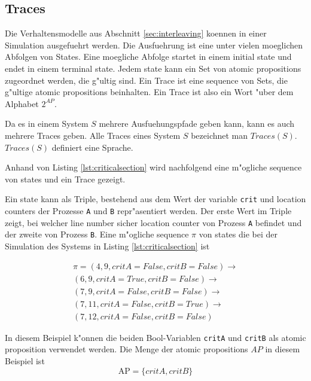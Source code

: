 \documentclass[11pt,twoside,a4paper]{article}
\begin{document}
\subsection{Traces}
\label{sec:traces}

Die Verhaltensmodelle aus Abschnitt \ref{sec:interleaving} koennen in einer Simulation ausgefuehrt werden. Die Ausfuehrung ist eine unter vielen moeglichen Abfolgen von States. Eine moegliche Abfolge startet in einem initial state und endet in einem terminal state. Jedem state kann ein Set von atomic propositions zugeordnet werden, die g"ultig sind. Ein Trace ist eine sequence von Sets, die g"ultige atomic propositions beinhalten. Ein Trace ist also ein Wort "uber dem Alphabet $2^{AP}$.

Da es in einem System $S$ mehrere Ausfuehungspfade geben kann, kann es auch mehrere Traces geben. Alle Traces eines System $S$ bezeichnet man $Traces(S)$. $Traces(S)$ definiert eine Sprache.

Anhand von Listing \ref{lst:criticalsection} wird nachfolgend eine m"ogliche sequence von states und ein Trace gezeigt.



Ein state kann als Triple, bestehend aus dem Wert der variable \verb|crit| und location counters der Prozesse \verb|A| und \verb|B| repr"asentiert werden. Der erste Wert im Triple zeigt, bei welcher line number sicher location counter von Prozess \verb|A| befindet und der zweite von Prozess \verb|B|.
Eine m"ogliche sequence $\pi$ von states die bei der Simulation des Systems in Listing \ref{lst:criticalsection} ist

\begin{equation}
  \label{eq:path}
  \begin{split}
\pi = (4, 9, {critA}={False},{critB}=False) \rightarrow \\
(6, 9, {critA}={True},{critB}=False) \rightarrow \\
(7, 9, {critA}={False},{critB}=False) \rightarrow \\
(7, 11, {critA}={False},{critB}=True) \rightarrow \\
(7, 12, {critA}={False},{critB}=False)
  \end{split}
\end{equation}

In diesem Beispiel k"onnen die beiden Bool-Variablen \verb|critA| und \verb|critB| als atomic proposition verwendet werden. Die Menge der atomic propositions $AP$ in diesem Beispiel ist
\[
\text{AP}=\{critA, critB\}
\]
\end{document}
